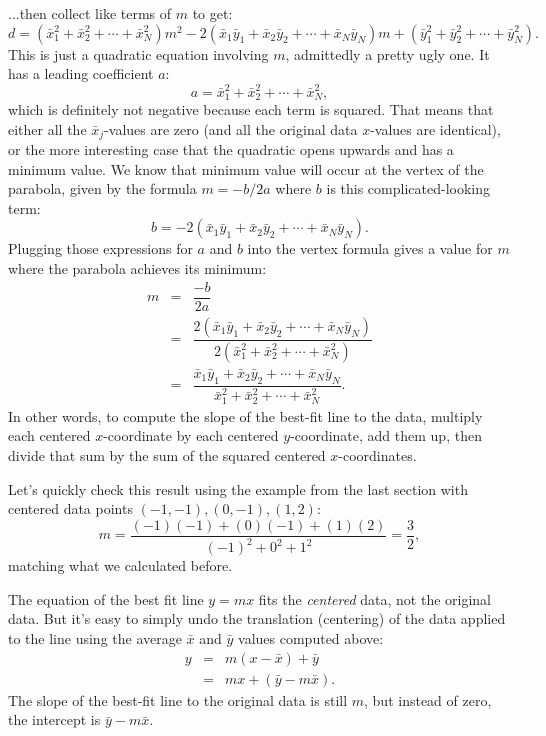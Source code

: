 \documentclass[10pt]{article}
\begin{document}
...then collect like terms of $m$ to get:
\[
d = (\bar{x}_1^2 + \bar{x}_2^2 + \cdots + \bar{x}_N^2)m^2 -2(\bar{x}_1\bar{y}_1 + \bar{x}_2\bar{y}_2 + \cdots + \bar{x}_N\bar{y}_N)m + (\bar{y}_1^2 + \bar{y}_2^2 + \cdots + \bar{y}_N^2).
\]
This is just a quadratic equation involving $m$, admittedly a pretty ugly one. It has a leading coefficient $a$:
\[
a = \bar{x}_1^2 + \bar{x}_2^2 + \cdots + \bar{x}_N^2,
\]
which is definitely not negative because each term is squared. That means that either all the $\bar{x}_j$-values are zero (and all the original data $x$-values are identical), or the more interesting case that the quadratic opens upwards and has a minimum value.
We know that minimum value will occur at the vertex of the parabola, given by the formula
$m = -b / 2a$ where $b$ is this complicated-looking term:
\[
b = -2(\bar{x}_1\bar{y}_1 + \bar{x}_2\bar{y}_2 + \cdots + \bar{x}_N\bar{y}_N).
\]
Plugging those expressions for $a$ and $b$ into the vertex formula gives a value for $m$ where the parabola achieves its minimum:
\[
\begin{array}{ccc}
m &=& \dfrac{-b}{2a}\\[8pt]
&=& \dfrac{2(\bar{x}_1\bar{y}_1 + \bar{x}_2\bar{y}_2 + \cdots + \bar{x}_N\bar{y}_N)}{2(\bar{x}_1^2 + \bar{x}_2^2 + \cdots + \bar{x}_N^2)}\\[14pt]
&=& \dfrac{\bar{x}_1\bar{y}_1 + \bar{x}_2\bar{y}_2 + \cdots + \bar{x}_N\bar{y}_N}{\bar{x}_1^2 + \bar{x}_2^2 + \cdots + \bar{x}_N^2}.
\end{array}
\]
In other words, to compute the slope of the best-fit line to the data, multiply
each centered $x$-coordinate by each centered $y$-coordinate, add them up, then
divide that sum by the sum of the squared centered $x$-coordinates.

Let's quickly check this result using the example from the last section with
centered data points $(-1,-1), (0,-1), (1,2)$:
\[
m = \dfrac{(-1)(-1) + (0)(-1) + (1)(2)}{(-1)^2 + 0^2 + 1^2} = \frac{3}{2},
\]
matching what we calculated before.


The equation of the best fit line $y=mx$ fits the {\it centered} data, not the
original data.  But it's easy to simply undo the translation (centering) of the
data applied to the line using the average $\bar{x}$ and $\bar{y}$ values
computed above:
\[
\begin{array}{ccc}
y &=& m(x - \bar{x}) + \bar{y}\\
&=& mx + (\bar{y} - m\bar{x}).
\end{array}
\]
The slope of the best-fit line to the original data is still $m$, but instead of zero, the intercept is
$\bar{y} - m\bar{x}$.
\end{document}
